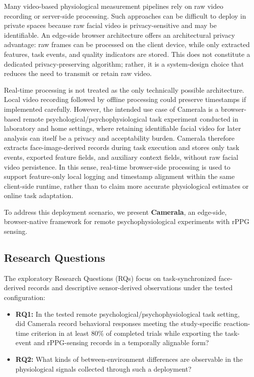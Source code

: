 \documentclass[dvipdfmx]{ehis}
\begin{document}
Many video-based physiological measurement pipelines rely on raw video recording or server-side processing.
Such approaches can be difficult to deploy in private spaces because raw facial video is privacy-sensitive and may be identifiable.
An edge-side browser architecture offers an architectural privacy advantage: raw frames can be processed on the client device, while only extracted features, task events, and quality indicators are stored.
This does not constitute a dedicated privacy-preserving algorithm; rather, it is a system-design choice that reduces the need to transmit or retain raw video.

Real-time processing is not treated as the only technically possible architecture.
Local video recording followed by offline processing could preserve timestamps if implemented carefully.
However, the intended use case of Camerala is a browser-based remote psychological/psychophysiological task experiment conducted in laboratory and home settings, where retaining identifiable facial video for later analysis can itself be a privacy and acceptability burden.
Camerala therefore extracts face-image-derived records during task execution and stores only task events, exported feature fields, and auxiliary context fields, without raw facial video persistence.
In this sense, real-time browser-side processing is used to support feature-only local logging and timestamp alignment within the same client-side runtime, rather than to claim more accurate physiological estimates or online task adaptation.

To address this deployment scenario, we present \textbf{Camerala}, an edge-side, browser-native framework for remote psychophysiological experiments with rPPG sensing.

\subsection{Research Questions}
The exploratory Research Questions (RQs) focus on task-synchronized face-derived records and descriptive sensor-derived observations under the tested configuration:
\begin{itemize}
    \item \textbf{RQ1:} In the tested remote psychological/psychophysiological task setting, did Camerala record behavioral responses meeting the study-specific reaction-time criterion in at least 80\% of completed trials while exporting the task-event and rPPG-sensing records in a temporally alignable form?
    \item \textbf{RQ2:} What kinds of between-environment differences are observable in the physiological signals collected through such a deployment?
\end{itemize}
\end{document}
